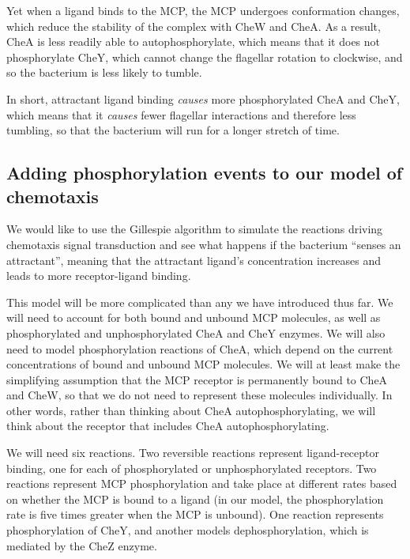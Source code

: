 Yet when a ligand binds to the MCP, the MCP undergoes conformation changes, which reduce the stability of the complex with CheW and CheA. As a result, CheA is less readily able to autophosphorylate, which means that it does not phosphorylate CheY, which cannot change the flagellar rotation to clockwise, and so the bacterium is less likely to tumble.

In short, attractant ligand binding \textit{causes} more phosphorylated CheA and CheY, which means that it \textit{causes} fewer flagellar interactions and therefore less tumbling, so that the bacterium will run for a longer stretch of time.\\

\begin{note}\end{note}


\FloatBarrier
{}
\subsection{Adding phosphorylation events to our model of chemotaxis}

We would like to use the Gillespie algorithm to simulate the reactions driving chemotaxis signal transduction and see what happens if the bacterium ``senses an attractant'', meaning that the attractant ligand's concentration increases and leads to more receptor-ligand binding.

This model will be more complicated than any we have introduced thus far. We will need to account for both bound and unbound MCP molecules, as well as phosphorylated and unphosphorylated CheA and CheY enzymes. We will also need to model phosphorylation reactions of CheA, which depend on the current concentrations of bound and unbound MCP molecules. We will at least make the simplifying assumption that the MCP receptor is permanently bound to CheA and CheW, so that we do not need to represent these molecules individually. In other words, rather than thinking about CheA autophosphorylating, we will think about the receptor that includes CheA autophosphorylating.

We will need six reactions. Two reversible reactions represent ligand-receptor binding, one for each of phosphorylated or unphosphorylated receptors. Two reactions represent MCP phosphorylation and take place at different rates based on whether the MCP is bound to a ligand (in our model, the phosphorylation rate is five times greater when the MCP is unbound). One reaction represents phosphorylation of CheY, and another models dephosphorylation, which is mediated by the CheZ enzyme.

